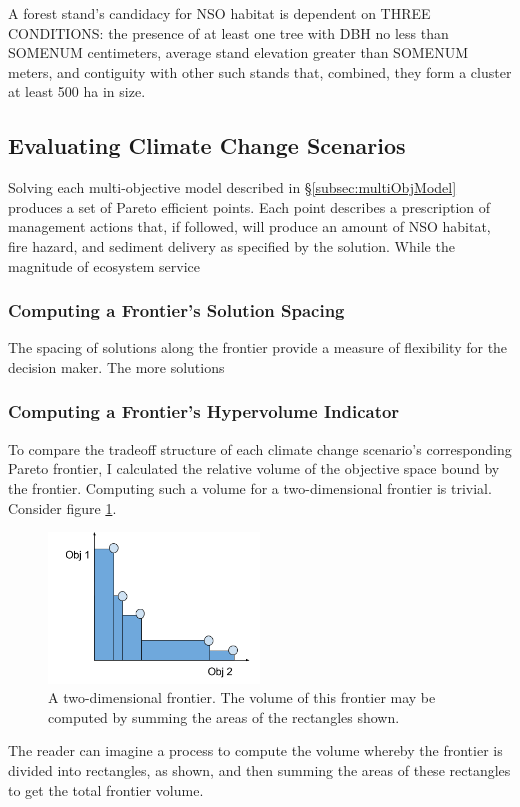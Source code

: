 A forest stand's candidacy for NSO habitat is dependent on THREE CONDITIONS: the presence of at least one tree with DBH no less than SOMENUM centimeters, average stand elevation greater than SOMENUM meters, and contiguity with other such stands that, combined, they form a cluster at least 500 ha in size.


\subsection{Evaluating Climate Change Scenarios}
Solving each multi-objective model described in \S \ref{subsec:multiObjModel} produces a set of Pareto efficient points. Each point describes a prescription of management actions that, if followed, will produce an amount of NSO habitat, fire hazard, and sediment delivery as specified by the solution. While the magnitude of ecosystem service 

\subsubsection{Computing a Frontier's Solution Spacing}
The spacing of solutions along the frontier provide a measure of flexibility for the decision maker. The more solutions 

\subsubsection{Computing a Frontier's Hypervolume Indicator}
To compare the tradeoff structure of each climate change scenario's corresponding Pareto frontier, I calculated the relative volume of the objective space bound by the frontier.  Computing such a volume for a two-dimensional frontier is trivial. Consider figure \ref{fig:2DFrontierVol}.
\begin{figure}[h]
  \centering
    \includegraphics[width=0.5\textwidth]{"../images/2DFrontierVolumeExample"}
  \caption{A two-dimensional frontier. The volume of this frontier may be computed by summing the areas of the rectangles shown.}
  \label{fig:2DFrontierVol}
\end{figure}
The reader can imagine a process to compute the volume whereby the frontier is divided into rectangles, as shown, and then summing the areas of these rectangles to get the total frontier volume.

